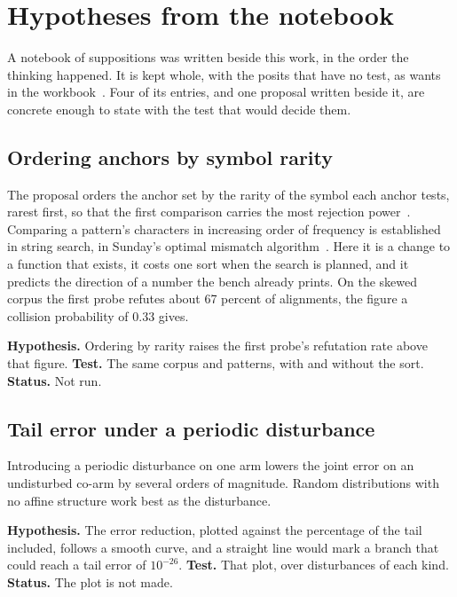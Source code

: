 \chapter{Hypotheses from the notebook}

A notebook of suppositions was written beside this work, in the order the thinking happened. It is kept
whole, with the posits that have no test, as wants in the workbook~\cite{src:Quigg-orior-workbook}.
Four of its entries, and one proposal written beside it, are concrete enough to state with the test
that would decide them.

\section{Ordering anchors by symbol rarity}

The proposal orders the anchor set by the rarity of the symbol each anchor tests, rarest first, so
that the first comparison carries the most rejection power~\cite{src:Quigg-delta-null}. Comparing a
pattern's characters in increasing order of frequency is established in string search, in Sunday's
optimal mismatch algorithm~\cite{src:Sunday-1990}. Here it is a change
to a function that exists, it costs one sort when the search is planned, and it predicts the direction
of a number the bench already prints. On the skewed corpus the first probe refutes about 67 percent of
alignments, the figure a collision probability of 0.33 gives.

\textbf{Hypothesis.} Ordering by rarity raises the first probe's refutation rate above that figure.
\textbf{Test.} The same corpus and patterns, with and without the sort. \textbf{Status.} Not run.

\section{Tail error under a periodic disturbance}

Introducing a periodic disturbance on one arm lowers the joint error on an undisturbed co-arm by
several orders of magnitude. Random distributions with no affine structure work best as the
disturbance.

\textbf{Hypothesis.} The error reduction, plotted against the percentage of the tail included, follows
a smooth curve, and a straight line would mark a branch that could reach a tail error of \(10^{-26}\).
\textbf{Test.} That plot, over disturbances of each kind. \textbf{Status.} The plot is not made.


